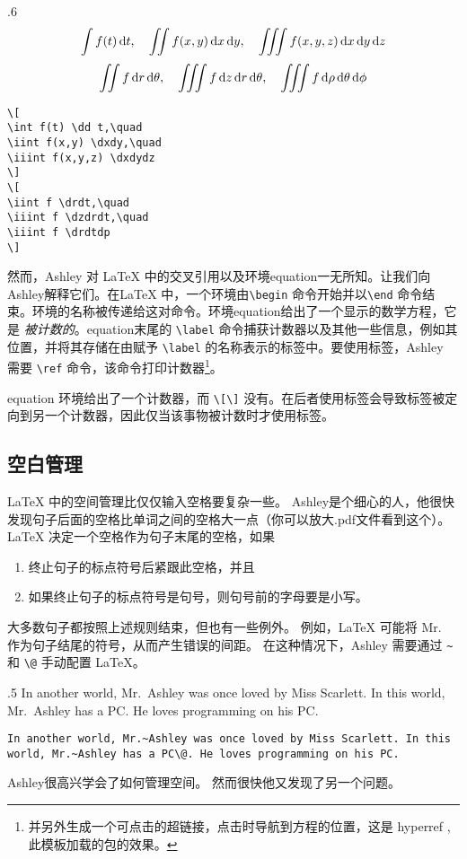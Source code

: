 \begin{miniexammar}{.6\textandmarginlen}%
{
\[
\int f(t) \,\mathrm{d} t,\quad
\iint f(x,y) \,\mathrm{d} x \,\mathrm{d} y,\quad
\iiint f(x,y,z) \,\mathrm{d} x \,\mathrm{d} y \,\mathrm{d} z
\]
\[
\iint f \,\mathrm{d} r \,\mathrm{d} \theta,\quad
\iiint f \,\mathrm{d} z \,\mathrm{d} r \,\mathrm{d} \theta,\quad
\iiint f \,\mathrm{d} \rho \,\mathrm{d} \theta \,\mathrm{d} \phi
\]
}
\begin{lstlisting}
\[
\int f(t) \dd t,\quad
\iint f(x,y) \dxdy,\quad
\iiint f(x,y,z) \dxdydz
\]
\[
\iint f \drdt,\quad
\iiint f \dzdrdt,\quad
\iiint f \drdtdp
\]
\end{lstlisting}
\end{miniexammar}

然而，Ashley 对 \LaTeX{} 中的交叉引用以及环境equation一无所知。让我们向Ashley解释它们。在\LaTeX{} 中，一个环境由\verb=\begin= 命令开始并以\verb=\end= 命令结束。环境的名称被传递给这对命令。环境equation给出了一个显示的数学方程，它是 \emph{被计数的}。equation末尾的 \verb=\label= 命令捕获计数器以及其他一些信息，例如其位置，并将其存储在由赋予 \verb=\label= 的名称表示的标签中。要使用标签，Ashley 需要 \verb=\ref= 命令，该命令打印计数器\footnote{并另外生成一个可点击的超链接，点击时导航到方程的位置，这是 hyperref ,此模板加载的包的效果。}。

equation 环境给出了一个计数器，而 \verb=\[\]= 没有。在后者使用标签会导致标签被定向到另一个计数器，因此仅当该事物被计数时才使用标签。

\subsection{空白管理}
\LaTeX{} 中的空间管理比仅仅输入空格要复杂一些。 Ashley是个细心的人，他很快发现句子后面的空格比单词之间的空格大一点（你可以放大.pdf文件看到这个）。 \LaTeX{} 决定一个空格作为句子末尾的空格，如果
\begin{enumerate}
\item 终止句子的标点符号后紧跟此空格，并且
\item 如果终止句子的标点符号是句号，则句号前的字母要是小写。
\end{enumerate}
大多数句子都按照上述规则结束，但也有一些例外。 例如，\LaTeX{} 可能将 Mr.~ 作为句子结尾的符号，从而产生错误的间距。 在这种情况下，Ashley 需要通过 \verb=~= 和 \verb=\@= 手动配置 \LaTeX{}。

\begin{parexammar}{.5\textandmarginlen}%
{
In another world, Mr.~Ashley was once loved by Miss Scarlett. In this world, Mr.~Ashley has a PC\@. He loves programming on his PC.
}
\begin{lstlisting}
In another world, Mr.~Ashley was once loved by Miss Scarlett. In this world, Mr.~Ashley has a PC\@. He loves programming on his PC.
\end{lstlisting}
\end{parexammar}
Ashley很高兴学会了如何管理空间。 然而很快他又发现了另一个问题。

